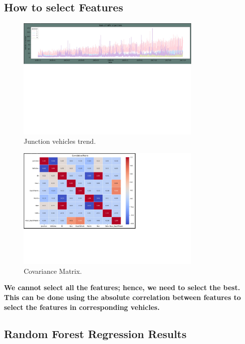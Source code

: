 \documentclass{IEEEtran}
\begin{document}
\subsection{How to select Features}
\begin{figure}[h]
    \centering
    \includegraphics[width=0.8\textwidth]{JunctionvsDatetrend.jpg}
    
    \caption{Junction vehicles trend.}
    \label{fig:FeaturesSelectionHelper}
\end{figure}
\begin{figure}[h]
    \centering
    \includegraphics[width=0.8\textwidth]{Covariane_matrix.jpg}
    
    \caption{Covariance Matrix.}
    \label{fig:FeaturesSelectionHelper}
\end{figure}



\textbf{We cannot select all the features; hence, we need to select the best. This can be done using the absolute correlation between features to select the features in corresponding vehicles.}
\clearpage
\subsection{Random Forest Regression Results}
\end{document}
